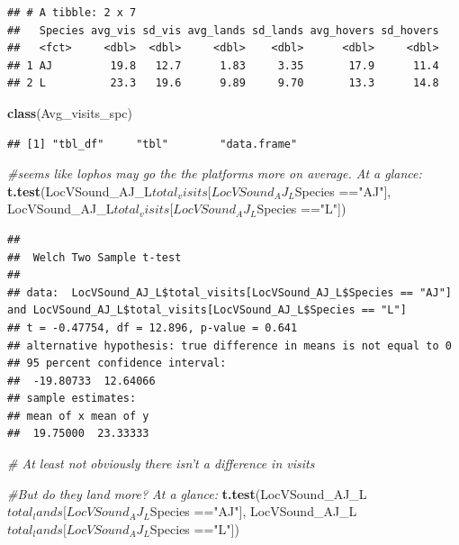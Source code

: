 \documentclass[]{article}
\newenvironment{Shaded}{\begin{snugshade}}{\end{snugshade}}
\newcommand{\KeywordTok}[1]{\textcolor[rgb]{0.13,0.29,0.53}{\textbf{{#1}}}}
\newcommand{\StringTok}[1]{\textcolor[rgb]{0.31,0.60,0.02}{{#1}}}
\newcommand{\CommentTok}[1]{\textcolor[rgb]{0.56,0.35,0.01}{\textit{{#1}}}}
\newcommand{\NormalTok}[1]{{#1}}
\begin{document}
\begin{verbatim}
## # A tibble: 2 x 7
##   Species avg_vis sd_vis avg_lands sd_lands avg_hovers sd_hovers
##   <fct>     <dbl>  <dbl>     <dbl>    <dbl>      <dbl>     <dbl>
## 1 AJ         19.8   12.7      1.83     3.35       17.9      11.4
## 2 L          23.3   19.6      9.89     9.70       13.3      14.8
\end{verbatim}

\begin{Shaded}
\begin{Highlighting}[]
\KeywordTok{class}\NormalTok{(Avg_visits_spc)}
\end{Highlighting}
\end{Shaded}

\begin{verbatim}
## [1] "tbl_df"     "tbl"        "data.frame"
\end{verbatim}

\begin{Shaded}
\begin{Highlighting}[]
\CommentTok{#seems like lophos may go the the platforms more on average. At a glance: }
\KeywordTok{t.test}\NormalTok{(LocVSound_AJ_L$total_visits[LocVSound_AJ_L$Species ==}\StringTok{"AJ"}\NormalTok{], LocVSound_AJ_L$total_visits[LocVSound_AJ_L$Species ==}\StringTok{"L"}\NormalTok{])}
\end{Highlighting}
\end{Shaded}

\begin{verbatim}
## 
##  Welch Two Sample t-test
## 
## data:  LocVSound_AJ_L$total_visits[LocVSound_AJ_L$Species == "AJ"] and LocVSound_AJ_L$total_visits[LocVSound_AJ_L$Species == "L"]
## t = -0.47754, df = 12.896, p-value = 0.641
## alternative hypothesis: true difference in means is not equal to 0
## 95 percent confidence interval:
##  -19.80733  12.64066
## sample estimates:
## mean of x mean of y 
##  19.75000  23.33333
\end{verbatim}

\begin{Shaded}
\begin{Highlighting}[]
\CommentTok{# At least not obviously there isn't a difference in visits}

\CommentTok{#But do they land more? At a glance: }
\KeywordTok{t.test}\NormalTok{(LocVSound_AJ_L$total_lands[LocVSound_AJ_L$Species ==}\StringTok{"AJ"}\NormalTok{], LocVSound_AJ_L$total_lands[LocVSound_AJ_L$Species ==}\StringTok{"L"}\NormalTok{])}
\end{Highlighting}
\end{Shaded}
\end{document}
